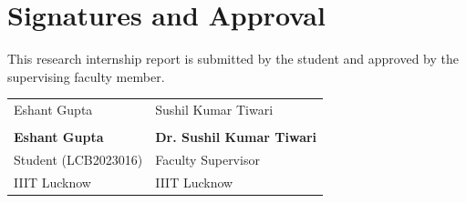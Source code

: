 \documentclass[conference]{IEEEtran}
\newcommand{\signature}[1]{{\usefont{OT1}{pzc}{m}{it}\Large #1}}
\begin{document}
\vspace{2cm}

\section*{Signatures and Approval}
This research internship report is submitted by the student and approved by the supervising faculty member.

\vspace{1.0cm}
\noindent\begin{tabular}{@{}p{4cm} p{5cm}@{}}
\signature{Eshant Gupta} & \signature{Sushil Kumar Tiwari} \\[0.2cm]
\hrulefill & \hrulefill \\
\textbf{Eshant Gupta} & \textbf{Dr. Sushil Kumar Tiwari} \\
Student (LCB2023016) & Faculty Supervisor \\
IIIT Lucknow & IIIT Lucknow \\
\end{tabular}
\end{document}

